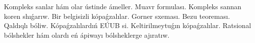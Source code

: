 Kompleks sanlar hám olar ústinde ámeller. Muavr formulası. 
Kompleks sannan koren shıǵarıw.
Bir belgisizli kópaǵzalılar. Gorner sxeması. Bezu teoreması. 
Qaldıqlı bóliw. 
Kópaǵzalılardıń EÚUB si. Keltirilmeytuǵın   kópaǵzalılar.
Ratsional bólshekler hám olardı eń ápiwayı bólsheklerge ajıratıw.